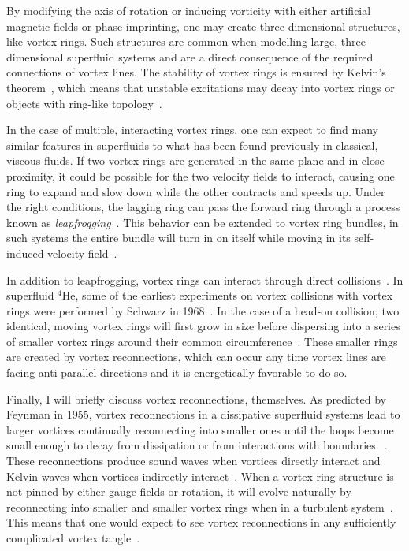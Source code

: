 By modifying the axis of rotation or inducing vorticity with either artificial magnetic fields or phase imprinting, one may create three-dimensional structures, like vortex rings.
Such structures are common when modelling large, three-dimensional superfluid systems and are a direct consequence of the required connections of vortex lines.
The stability of vortex rings is ensured by Kelvin's theorem~\cite{donnelly1991}, which means that unstable excitations may decay into vortex rings or objects with ring-like topology~\cite{anderson2001}.

In the case of multiple, interacting vortex rings, one can expect to find many similar features in superfluids to what has been found previously in classical, viscous fluids. 
If two vortex rings are generated in the same plane and in close proximity, it could be possible for the two velocity fields to interact, causing one ring to expand and slow down while the other contracts and speeds up. 
Under the right conditions, the lagging ring can pass the forward ring through a process known as \textit{leapfrogging}~\cite{sommerfield1950, caplan2014}.
This behavior can be extended to vortex ring bundles, in such systems the entire bundle will turn in on itself while moving in its self-induced velocity field~\cite{wacks2014}.

In addition to leapfrogging, vortex rings can interact through direct collisions~\cite{shariff1992}. 
In superfluid $^4$He, some of the earliest experiments on vortex collisions with vortex rings were performed by Schwarz in 1968~\cite{schwarz1968}.
In the case of a head-on collision, two identical, moving vortex rings will first grow in size before dispersing into a series of smaller vortex rings around their common circumference~\cite{lim1995}. 
These smaller rings are created by vortex reconnections, which can occur any time vortex lines are facing anti-parallel directions and it is energetically favorable to do so.

Finally, I will briefly discuss vortex reconnections, themselves.
As predicted by Feynman in 1955, vortex reconnections in a dissipative superfluid systems lead to larger vortices continually reconnecting into smaller ones until the loops become small enough to decay from dissipation or from interactions with boundaries.~\cite{feynman1955}.
These reconnections produce sound waves when vortices directly interact and Kelvin waves when vortices indirectly interact~\cite{paoletti2011}.
When a vortex ring structure is not pinned by either gauge fields or rotation, it will evolve naturally by reconnecting into smaller and smaller vortex rings when in a turbulent system~\cite{jackson1999}. 
This means that one would expect to see vortex reconnections in any sufficiently complicated vortex tangle~\cite{barenghi2014}.

